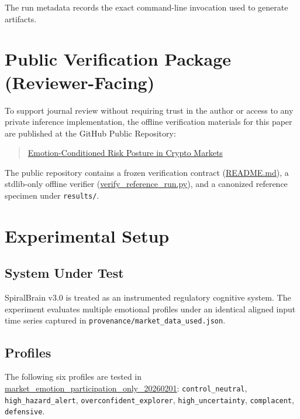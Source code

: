 \documentclass[12pt,a4paper]{article}
\begin{document}
The run metadata records the exact command-line invocation used to generate artifacts.

\section{Public Verification Package (Reviewer-Facing)}

To support journal review without requiring trust in the author or access to any private inference implementation, the offline verification materials for this paper are published at the GitHub Public Repository:
\begin{quote}
\href{https://github.com/jhcragin/SpiralBrain-v3.0-public/tree/main/Emotion-Conditioned%20Risk%20Posture%20in%20Crypto%20Markets}{Emotion-Conditioned Risk Posture in Crypto Markets}
\end{quote}

The public repository contains a frozen verification contract (\href{https://github.com/jhcragin/SpiralBrain-v3.0-public/blob/main/README.md}{README.md}), a stdlib-only offline verifier (\href{https://github.com/jhcragin/SpiralBrain-v3.0-public/blob/main/Emotion-Conditioned%20Risk%20Posture%20in%20Crypto%20Markets/verify_reference_run.py}{verify_reference_run.py}), and a canonized reference specimen under \texttt{results/}.

\section{Experimental Setup}

\subsection{System Under Test}

SpiralBrain v3.0 is treated as an instrumented regulatory cognitive system. The experiment evaluates multiple emotional profiles under an identical aligned input time series captured in \texttt{provenance/market\_data\_used.json}.


\subsection{Profiles}

The following six profiles are tested in \href{https://github.com/jhcragin/SpiralBrain-v3.0-public/tree/main/Emotion-Conditioned%20Risk%20Posture%20in%20Crypto%20Markets/results}{market_emotion_participation_only_20260201}:
\texttt{control\_neutral}, \texttt{high\_hazard\_alert}, \texttt{overconfident\_explorer}, \texttt{high\_uncertainty}, \texttt{complacent}, \texttt{defensive}.
\end{document}
